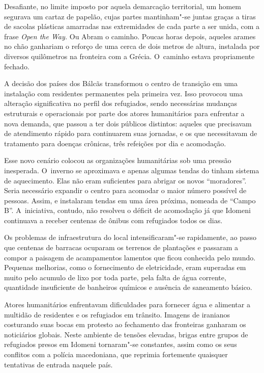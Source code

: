 Desafiante, no limite imposto por aquela demarcação territorial, um
homem segurava um cartaz de papelão, cujas partes mantinham"-se juntas
graças a tiras de sacolas plásticas amarradas nas extremidades de cada
parte a ser unida, com a frase \emph{Open the Way.} Ou Abram o caminho.
Poucas horas depois, aqueles arames no chão ganhariam o reforço de uma
cerca de dois metros de altura, instalada por diversos quilômetros na
fronteira com a Grécia. O~caminho estava propriamente fechado.

A decisão dos países dos Bálcãs transformou o centro de transição em uma
instalação com residentes permanentes pela primeira vez. Isso provocou
uma alteração significativa no perfil dos refugiados, sendo necessárias
mudanças estruturais e operacionais por parte dos atores humanitários
para enfrentar a nova demanda, que passou a ter dois públicos distintos:
aqueles que precisavam de atendimento rápido para continuarem suas
jornadas, e os que necessitavam de tratamento para doenças crônicas,
três refeições por dia e acomodação.

Esse novo cenário colocou as organizações humanitárias sob uma pressão
inesperada. O~inverno se aproximava e apenas algumas tendas do 
tinham sistema de aquecimento. Elas não eram suficientes para abrigar os
novos ``moradores''. Seria necessário expandir o centro para acomodar o
maior número possível de pessoas. Assim,  e  instalaram tendas
em uma área próxima, nomeada de ``Campo B''. A~iniciativa, contudo, não
resolveu o déficit de acomodação já que Idomeni continuava a receber
centenas de ônibus com refugiados todos os dias.

Os problemas de infraestrutura do local intensificaram"-se rapidamente,
ao passo que centenas de barracas ocuparam os terrenos de plantações e
passaram a compor a paisagem de acampamentos lamentos que ficou
conhecida pelo mundo. Pequenas melhorias, como o fornecimento de
eletricidade, eram superadas em muito pelo acumulo de lixo por toda
parte, pela falta de água corrente, quantidade insuficiente de banheiros
químicos e ausência de saneamento básico.

Atores humanitários enfrentavam dificuldades para fornecer água e
alimentar a multidão de residentes e os refugiados em trânsito. Imagens
de iranianos costurando suas bocas em protesto ao fechamento das
fronteiras ganharam os noticiários globais. Neste ambiente de tensões
elevadas, brigas entre grupos de refugiados presos em Idomeni
tornaram"-se constantes, assim como os seus conflitos com a polícia
macedoniana, que reprimia fortemente quaisquer tentativas de entrada
naquele país.

